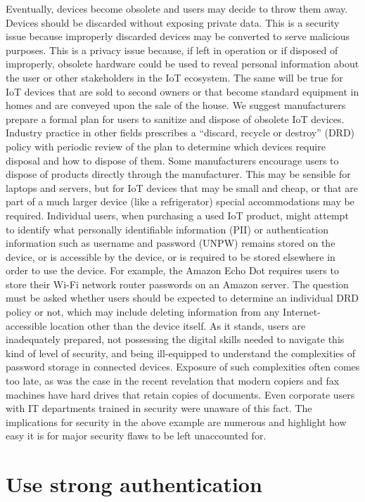 \documentclass[12pt]{report}
\begin{document}
Eventually, devices become obsolete and users may decide to throw them away. 
Devices should be discarded without exposing private data. This is a security 
issue because improperly discarded devices may be converted to serve malicious 
purposes. This is a privacy issue because, if left in operation or if disposed of 
improperly, obsolete hardware could be used to reveal personal information about 
the user or other stakeholders in the IoT ecosystem. The same will be true for 
IoT devices that are sold to second owners or that become standard equipment in 
homes and are conveyed upon the sale of the house. We suggest manufacturers prepare 
a formal plan for users to sanitize and dispose of obsolete IoT devices. Industry 
practice in other fields prescribes a “discard, recycle or destroy” (DRD) policy 
with periodic review of the plan to determine which devices require disposal and 
how to dispose of them. Some manufacturers encourage users to dispose of products 
directly through the manufacturer. This may be sensible for laptops and servers, 
but for IoT devices that may be small and cheap, or that are part of a much larger 
device (like a refrigerator) special accommodations may be required. Individual 
users, when purchasing a used IoT product, might attempt to identify what personally 
identifiable information (PII) or authentication information such as username and 
password (UNPW) remains stored on the device, or is accessible by the device, or 
is required to be stored elsewhere in order to use the device. For example, 
the Amazon Echo Dot requires users to store their Wi-Fi network router passwords 
on an Amazon server. The question must be asked whether users should be expected 
to determine an individual DRD policy or not, which may include deleting information 
from any Internet-accessible location other than the device itself. As it stands, 
users are inadequately prepared, not possessing the digital skills needed to navigate 
this kind of level of security, and being ill-equipped to understand the complexities 
of password storage in connected devices. Exposure of such complexities often comes 
too late, as was the case in the recent revelation that modern copiers and fax 
machines have hard drives that retain copies of documents. Even corporate users 
with IT departments trained in security were unaware of this fact. 
The implications for security in the above example are numerous and highlight 
how easy it is for major security flaws to be left unaccounted for.

\section{Use strong authentication}
\end{document}
